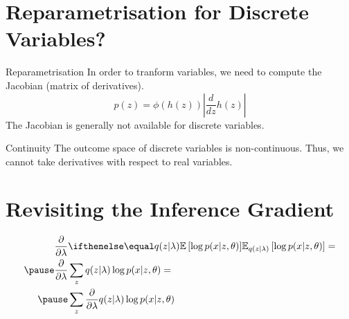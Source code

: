 \documentclass[14pt]{beamer}
\begin{document}
\begin{frame}
\tableofcontents
\end{frame}

\section{Reparametrisation for Discrete Variables?}
\begin{frame}
\tableofcontents[currentsection]
\end{frame}

\begin{frame}{Reparametrisation}
In order to tranform variables, we need to compute the Jacobian (matrix of derivatives).
\begin{equation*}
p(z) = \phi(h(z))\left|\frac{d}{dz}h(z)\right|
\end{equation*}
The Jacobian is generally not available for discrete variables. 
\end{frame}


\begin{frame}{Continuity}
The outcome space of discrete variables is non-continuous. Thus, we cannot take derivatives with
respect to real variables. 
\end{frame}

\section{Revisiting the Inference Gradient}
\begin{frame}
\tableofcontents[currentsection]
\end{frame}

\begin{frame}
\begin{equation*}
\begin{aligned}
\frac{\partial}{\partial \lambda}&\E[q(z|\lambda)]{\log p(x|z,\theta)} = \\
\pause
\frac{\partial}{\partial \lambda}&\sum_{z} q(z|\lambda) \log p(x|z,\theta) = \\
\pause
&\sum_{z}\frac{\partial}{\partial \lambda} q(z|\lambda) \log p(x|z,\theta)
\end{aligned}
\end{equation*}
\end{frame}
\end{document}

